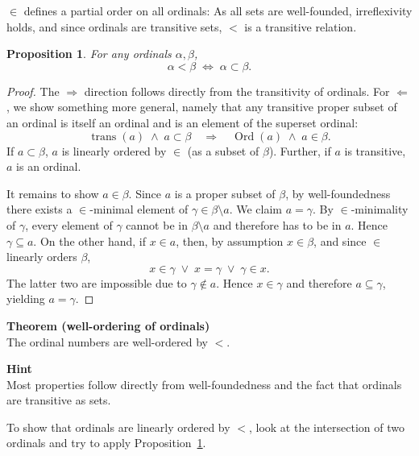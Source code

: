 \documentclass{article}
\newcommand{\Op}[1]{\operatorname{#1}}
\newtheorem{proposition}{Proposition}[section]
\begin{document}
$\in$ defines a partial order on all ordinals:
As all sets are well-founded, irreflexivity holds, and since ordinals are transitive sets, $<$ is a transitive relation.

\begin{proposition}\label{pro-order-ordinals}For any ordinals $\alpha, \beta$,
\begin{equation}

\alpha < \beta \; \iff \; \alpha \subset \beta.
\end{equation}

\end{proposition}\begin{proof}The $\Rightarrow$ direction follows directly from the transitivity of ordinals.
For $\Leftarrow$, we show something more general, namely that any transitive proper subset of an ordinal is itself an ordinal and is an element of the superset ordinal:
\begin{equation}

\Op{trans}(a) \; \wedge \; a \subset \beta \quad \Rightarrow \quad \Op{Ord}(a) \; \wedge \; a \in \beta.
\end{equation}
If $a \subset \beta$, $a$ is linearly ordered by $\in$ (as a subset of $\beta$). Further, if $a$ is transitive, $a$ is an ordinal.

It remains to show $a \in \beta$. Since $a$ is a proper subset of $\beta$, by well-foundedness there exists a $\in$-minimal element of $\gamma \in \beta \setminus a$. We claim $a = \gamma$. By $\in$-minimality of $\gamma$, every element of $\gamma$ cannot be in $\beta\setminus a$ and therefore has to be in $a$. Hence $\gamma \subseteq a$. On the other hand, if $x \in a$, then, by assumption $x \in \beta$, and since $\in$ linearly orders $\beta$,
\begin{equation}

x \in \gamma \; \vee \; x = \gamma \; \vee \; \gamma \in x.
\end{equation}
The latter two are impossible due to $\gamma \notin a$. Hence $x \in \gamma$ and therefore $a \subseteq \gamma$, yielding $a =\gamma$.

\end{proof}\begin{framed}
\textbf{Theorem (well-ordering of ordinals)}\\
The ordinal numbers are well-ordered by $<$.
\end{framed}

\begin{framed}
\textbf{Hint}\\
Most properties follow directly from well-foundedness and the fact that ordinals are transitive as sets.

To show that ordinals are linearly ordered by $<$, look at the intersection of two ordinals and try to apply Proposition~\ref{pro-order-ordinals}.
\end{framed}
\end{document}
